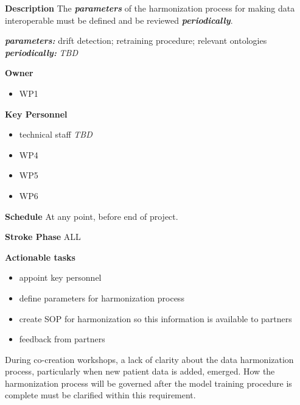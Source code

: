 \documentclass[
  letterpaper,
  DIV=11,
  numbers=noendperiod]{scrreport}
\providecommand{\tightlist}{%
  \setlength{\itemsep}{0pt}\setlength{\parskip}{0pt}}\usepackage{longtable,booktabs,array}
\begin{document}
\textbf{Description} The \textbf{\emph{parameters}} of the harmonization
process for making data interoperable must be defined and be reviewed
\textbf{\emph{periodically}}.

\textbf{\emph{parameters:}} drift detection; retraining procedure;
relevant ontologies \textbf{\emph{periodically:}} \emph{TBD}

\textbf{Owner}

\begin{itemize}
\tightlist
\item
  WP1
\end{itemize}

\textbf{Key Personnel}

\begin{itemize}
\tightlist
\item
  technical staff \emph{TBD}
\item
  WP4
\item
  WP5
\item
  WP6
\end{itemize}

\textbf{Schedule} At any point, before end of project.

\textbf{Stroke Phase} ALL

\textbf{Actionable tasks}

\begin{itemize}
\tightlist
\item
  appoint key personnel
\item
  define parameters for harmonization process
\item
  create SOP for harmonization so this information is available to
  partners
\item
  feedback from partners
\end{itemize}

\begin{tcolorbox}[enhanced jigsaw, arc=.35mm, breakable, coltitle=black, toptitle=1mm, colbacktitle=quarto-callout-note-color!10!white, toprule=.15mm, left=2mm, bottomrule=.15mm, opacitybacktitle=0.6, titlerule=0mm, colback=white, opacityback=0, title=\textcolor{quarto-callout-note-color}{\faInfo}\hspace{0.5em}{Note}, bottomtitle=1mm, colframe=quarto-callout-note-color-frame, leftrule=.75mm, rightrule=.15mm]

During co-creation workshops, a lack of clarity about the data
harmonization process, particularly when new patient data is added,
emerged. How the harmonization process will be governed after the model
training procedure is complete must be clarified within this
requirement.

\end{tcolorbox}
\end{document}
